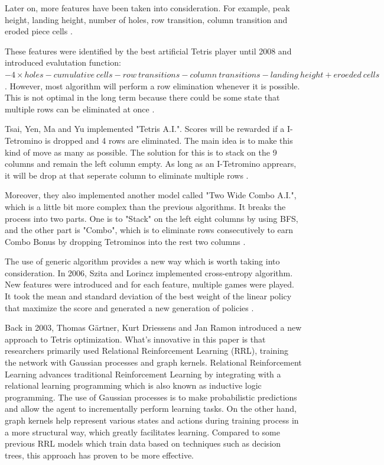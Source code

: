 \documentclass[letterpaper]{article} %
\begin{document}
Later on, more features have been taken into consideration. For example, peak height, landing height, number of holes, row transition, column transition and eroded piece cells \cite{WCWT}. 

These features were identified by the best artificial Tetris player until 2008 and introduced evalutation function: 
$-4 \times holes - cumulative\ cells - row\ transitions - column\ transitions - landing\ height + eroeded\ cells$ \cite{SO19}. However, most algorithm will perform a row elimination whenever it is possible. This is not optimal in the long term because there could be some state that multiple rows can be eliminated at once \cite{WCWT}. 

Tsai, Yen, Ma and Yu implemented "Tetris A.I.". Scores will be rewarded if a I-Tetromino is dropped and 4 rows are eliminated. The main idea is to make this kind of move as many as possible. The solution for this is to stack on the 9 columns and remain the left column empty. As long as an I-Tetromino apprears, it will be drop at that seperate column to eliminate multiple rows \cite{WCWT}.

Moreover, they also implemented another model called "Two Wide Combo A.I.", which is a little bit more complex than the previous algorithms. It breaks the process into two parts. One is to "Stack" on the left eight columns by using BFS, and the other part is "Combo", which is to eliminate rows consecutively to earn Combo Bonus by dropping Tetrominos into the rest two columns \cite{WCWT}.

The use of generic algorithm provides a new way which is worth taking into consideration. In 2006, Szita and Lorincz implemented cross-entropy algorithm. New features were introduced and for each feature, multiple games were played. It took the mean and standard deviation of the best weight of the linear policy that maximize the score and generated a new generation of policies \cite{SO19}.

Back in 2003, Thomas Gärtner, Kurt Driessens and Jan Ramon introduced a new approach to Tetris optimization\cite{s017}. What's innovative in this paper is that researchers primarily used Relational Reinforcement Learning (RRL), training the network with Gaussian processes and graph kernels. Relational Reinforcement Learning advances traditional Reinforcement Learning by integrating with a relational learning programming which is also known as inductive logic programming. The use of Gaussian processes is to make probabilistic predictions and allow the agent to incrementally perform learning tasks. On the other hand, graph kernels help represent various states and actions during training process in a more structural way, which greatly facilitates learning. Compared to some previous RRL models which train data based on techniques such as decision trees, this approach has proven to be more effective.
\end{document}

